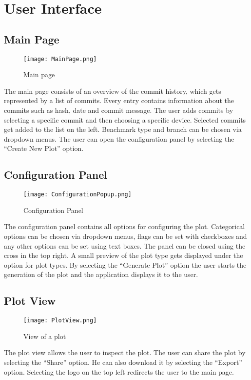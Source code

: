 \section{User Interface}

\subsection{Main Page}

\begin{figure}[H]
    \texttt{[image: MainPage.png]}
    \caption{Main page}
    \label{ui:main}
\end{figure}

The main page consists of an overview of the commit history, which gets represented by a list of commits. Every entry contains information about the commits such as hash, date and commit message. The user adds commits by selecting a specific commit and then choosing a specific device. Selected commits get added to the list on the left. Benchmark type and branch can be chosen via dropdown menus. The user can open the configuration panel by selecting the \enquote{Create New Plot} option.

\subsection{Configuration Panel}

\begin{figure}[H]
    \texttt{[image: ConfigurationPopup.png]}
    \caption{Configuration Panel}
    \label{ui:config}
\end{figure}

The configuration panel contains all options for configuring the \gls{plot}. Categorical options can be chosen via dropdown menus, flags can be set with checkboxes and any other options can be set using text boxes. The panel can be closed using the cross in the top right. A small preview of the \gls{plot} type gets displayed under the option for \glspl{plot type}. By selecting the \enquote{Generate Plot} option the user starts the generation of the \gls{plot} and the application displays it to the user.

\subsection{Plot View}

\begin{figure}[H]
    \texttt{[image: PlotView.png]}
    \caption{View of a \gls{plot}}
    \label{ui:plot}
\end{figure}

The plot view allows the user to inspect the \gls{plot}. The user can share the \gls{plot} by selecting the \enquote{Share} option. He can also download it by selecting the \enquote{Export} option. Selecting the logo on the top left redirects the user to the main page.
